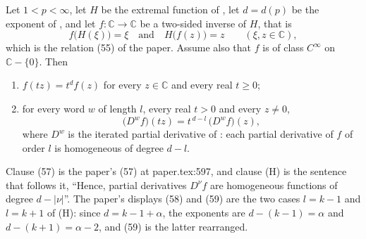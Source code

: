 \begin{lemma}
Let $1<p<\infty$, let $H$ be the extremal function of , let
$d=d(p)$ be the exponent of , and let
$f\colon\mathbb{C}\to\mathbb{C}$ be a two-sided inverse of $H$, that is
\[
  f\bigl(H(\xi)\bigr)=\xi\quad\text{and}\quad H\bigl(f(z)\bigr)=z
  \qquad(\xi,z\in\mathbb{C}),
\]
which is the relation (55) of the paper.  Assume also that $f$ is of class
$C^\infty$ on $\mathbb{C}-\{0\}$.  Then
\begin{enumerate}
\item[(57)] $f(tz)=t^{d}f(z)$ for every $z\in\mathbb{C}$ and every real
$t\ge0$;
\item[(H)] for every word $w$ of length $l$, every real $t>0$ and every
$z\neq0$,
\[
  \bigl(D^{w}f\bigr)(tz)=t^{\,d-l}\,\bigl(D^{w}f\bigr)(z),
\]
where $D^{w}$ is the iterated partial derivative of :
each partial derivative of $f$ of order $l$ is homogeneous of degree $d-l$.
\end{enumerate}

Clause (57) is the paper's (57) at paper.tex:597, and clause (H) is the
sentence that follows it, ``Hence, partial derivatives $D^\nu f$ are
homogeneous functions of degree $d-|\nu|$''.  The paper's displays (58) and
(59) are the two cases $l=k-1$ and $l=k+1$ of (H): since $d=k-1+\alpha$, the
exponents are $d-(k-1)=\alpha$ and $d-(k+1)=\alpha-2$, and (59) is the latter
rearranged.
\end{lemma}

